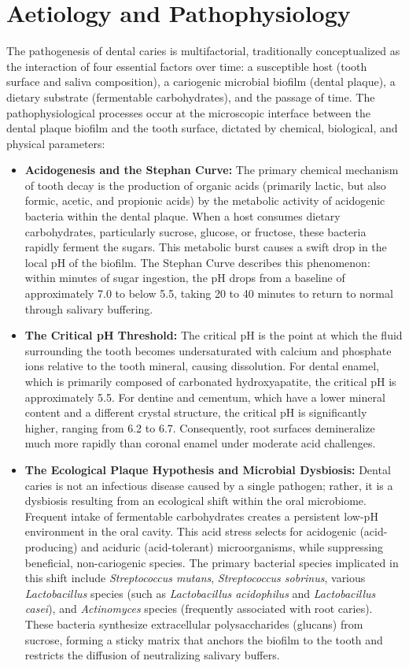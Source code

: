 \section*{Aetiology and Pathophysiology}
The pathogenesis of dental caries is multifactorial, traditionally conceptualized as the interaction of four essential factors over time: a susceptible host (tooth surface and saliva composition), a cariogenic microbial biofilm (dental plaque), a dietary substrate (fermentable carbohydrates), and the passage of time. The pathophysiological processes occur at the microscopic interface between the dental plaque biofilm and the tooth surface, dictated by chemical, biological, and physical parameters:

\begin{itemize}
    \item \textbf{Acidogenesis and the Stephan Curve:} The primary chemical mechanism of tooth decay is the production of organic acids (primarily lactic, but also formic, acetic, and propionic acids) by the metabolic activity of acidogenic bacteria within the dental plaque. When a host consumes dietary carbohydrates, particularly sucrose, glucose, or fructose, these bacteria rapidly ferment the sugars. This metabolic burst causes a swift drop in the local pH of the biofilm. The Stephan Curve describes this phenomenon: within minutes of sugar ingestion, the pH drops from a baseline of approximately 7.0 to below 5.5, taking 20 to 40 minutes to return to normal through salivary buffering.
    \item \textbf{The Critical pH Threshold:} The critical pH is the point at which the fluid surrounding the tooth becomes undersaturated with calcium and phosphate ions relative to the tooth mineral, causing dissolution. For dental enamel, which is primarily composed of carbonated hydroxyapatite, the critical pH is approximately 5.5. For dentine and cementum, which have a lower mineral content and a different crystal structure, the critical pH is significantly higher, ranging from 6.2 to 6.7. Consequently, root surfaces demineralize much more rapidly than coronal enamel under moderate acid challenges.
    \item \textbf{The Ecological Plaque Hypothesis and Microbial Dysbiosis:} Dental caries is not an infectious disease caused by a single pathogen; rather, it is a dysbiosis resulting from an ecological shift within the oral microbiome. Frequent intake of fermentable carbohydrates creates a persistent low-pH environment in the oral cavity. This acid stress selects for acidogenic (acid-producing) and aciduric (acid-tolerant) microorganisms, while suppressing beneficial, non-cariogenic species. The primary bacterial species implicated in this shift include \textit{Streptococcus mutans}, \textit{Streptococcus sobrinus}, various \textit{Lactobacillus} species (such as \textit{Lactobacillus acidophilus} and \textit{Lactobacillus casei}), and \textit{Actinomyces} species (frequently associated with root caries). These bacteria synthesize extracellular polysaccharides (glucans) from sucrose, forming a sticky matrix that anchors the biofilm to the tooth and restricts the diffusion of neutralizing salivary buffers.

\end{itemize}
